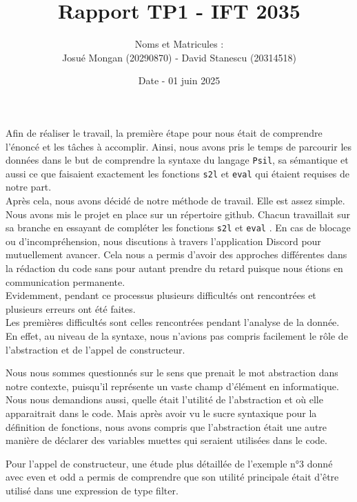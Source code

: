 \documentclass[11pt]{article}
\title{Rapport TP1 - IFT 2035}
\author{ Noms et Matricules : \vspace{0.2cm}\\
	Josué Mongan (20290870) - David Stanescu (20314518)}
\date{Date - 01 juin 2025}
\newcommand{\eval}{\texttt{eval} }
\newcommand{\stol}{\texttt{s2l} }
\begin{document}
\maketitle	
\pagebreak

Afin de réaliser le travail, la première étape pour nous était de comprendre l'énoncé et les tâches à accomplir. Ainsi, nous avons pris le temps de parcourir les données dans le but de comprendre la syntaxe du langage \texttt{Psil}, sa sémantique et aussi ce que faisaient exactement les fonctions \stol et \eval qui étaient requises de notre part.\\

Après cela, nous avons décidé de notre méthode de travail. Elle est assez simple. Nous avons mis le projet en place sur un répertoire github. Chacun travaillait sur sa branche en essayant de compléter les fonctions \stol et \eval. En cas de blocage ou d'incompréhension, nous discutions à travers l'application Discord pour mutuellement avancer. Cela nous a permis d'avoir des approches différentes dans la rédaction du code sans pour autant prendre du retard puisque nous étions en communication permanente.\\

Evidemment, pendant ce processus plusieurs difficultés ont rencontrées et plusieurs erreurs ont été faites.\\

Les premières difficultés sont celles rencontrées pendant l'analyse de la donnée. En effet, au niveau de la syntaxe, nous n'avions pas compris facilement le rôle de l'abstraction et de l'appel de constructeur.

Nous nous sommes questionnés sur le sens que prenait le mot abstraction dans notre contexte, puisqu'il représente un vaste champ d'élément en informatique. Nous nous demandions aussi, quelle était l'utilité de l'abstraction et où elle apparaitrait dans le code. Mais après avoir vu le sucre syntaxique pour la définition de fonctions, nous avons compris que l'abstraction était une autre manière de déclarer des variables muettes qui seraient utilisées dans le code.

Pour l'appel de constructeur, une étude plus détaillée de l'exemple n°3 donné avec even et odd a permis de comprendre que son utilité principale était d'être utilisé dans une expression de type filter.\\
\end{document}
